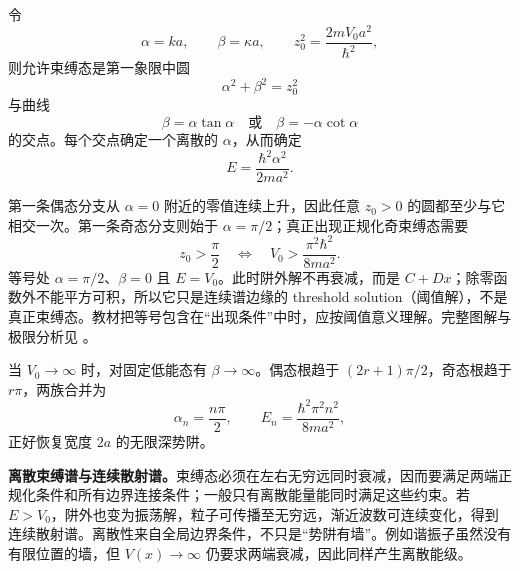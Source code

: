 令
\begin{equation}
  \alpha=ka,
  \qquad
  \beta=\kappa a,
  \qquad
  z_0^2=\frac{2mV_0a^2}{\hbar^2},
  \label{eq:QM-C05-S02-dimensionless-variables}
\end{equation}
则允许束缚态是第一象限中圆
\begin{equation}
  \alpha^2+\beta^2=z_0^2
  \label{eq:QM-C05-S02-dimensionless-circle}
\end{equation}
与曲线
\begin{equation}
  \beta=\alpha\tan\alpha
  \quad\text{或}\quad
  \beta=-\alpha\cot\alpha
  \label{eq:QM-C05-S02-dimensionless-curves}
\end{equation}
的交点。每个交点确定一个离散的 $\alpha$，从而确定
\begin{equation}
  E=\frac{\hbar^2\alpha^2}{2ma^2}.
  \label{eq:QM-C05-S02-energy-from-alpha}
\end{equation}

第一条偶态分支从 $\alpha=0$ 附近的零值连续上升，因此任意 $z_0>0$ 的圆都至少与它相交一次。第一条奇态分支则始于 $\alpha=\pi/2$；真正出现正规化奇束缚态需要
\begin{equation}
  z_0>\frac\pi2
  \quad\Longleftrightarrow\quad
  \boxed{V_0>\frac{\pi^2\hbar^2}{8ma^2}}.
  \label{eq:QM-C05-S02-first-odd-threshold}
\end{equation}
等号处 $\alpha=\pi/2$、$\beta=0$ 且 $E=V_0$。此时阱外解不再衰减，而是 $C+Dx$；除零函数外不能平方可积，所以它只是连续谱边缘的 threshold solution（阈值解），不是真正束缚态。教材把等号包含在“出现条件”中时，应按阈值意义理解。完整图解与极限分析见
。

当 $V_0\to\infty$ 时，对固定低能态有 $\beta\to\infty$。偶态根趋于 $(2r+1)\pi/2$，奇态根趋于 $r\pi$，两族合并为
\begin{equation}
  \alpha_n=\frac{n\pi}{2},
  \qquad
  E_n=\frac{\hbar^2\pi^2n^2}{8ma^2},
  \label{eq:QM-C05-S02-infinite-limit}
\end{equation}
正好恢复宽度 $2a$ 的无限深势阱。

\textbf{离散束缚谱与连续散射谱。}束缚态必须在左右无穷远同时衰减，因而要满足两端正规化条件和所有边界连接条件；一般只有离散能量能同时满足这些约束。若 $E>V_0$，阱外也变为振荡解，粒子可传播至无穷远，渐近波数可连续变化，得到连续散射谱。离散性来自全局边界条件，不只是“势阱有墙”。例如谐振子虽然没有有限位置的墙，但 $V(x)\to\infty$ 仍要求两端衰减，因此同样产生离散能级。


